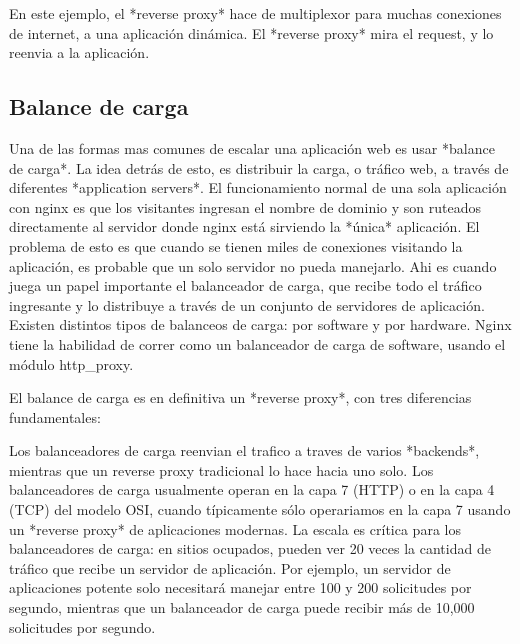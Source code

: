 En este ejemplo, el *reverse proxy* hace de multiplexor para muchas conexiones de internet, a una aplicación dinámica. El *reverse proxy* mira el request, y lo reenvia a la aplicación.

\subsection[Balance de carga]{Balance de carga}

Una de las formas mas comunes de escalar una aplicación web es usar *balance de carga*. La idea detrás de esto, es distribuir la carga, o tráfico web, a través de diferentes *application servers*.
El funcionamiento normal de una sola aplicación con nginx es que los visitantes ingresan el nombre de dominio y son ruteados directamente al servidor donde nginx está sirviendo la *única* aplicación. El problema de esto es que cuando se tienen miles de conexiones visitando la aplicación, es probable que un solo servidor no pueda manejarlo. 
Ahi es cuando juega un papel importante el balanceador de carga, que recibe todo el tráfico ingresante y lo distribuye a través de un conjunto de servidores de aplicación.
Existen distintos tipos de balanceos de carga: por software y por hardware. Nginx tiene la habilidad de correr como un balanceador de carga de software, usando el módulo http_proxy.

El balance de carga es en definitiva un *reverse proxy*, con tres diferencias fundamentales: 
\begin{outline}
\1 Los balanceadores de carga reenvian el trafico a traves de varios *backends*, mientras que un reverse proxy tradicional lo hace hacia uno solo.
\1 Los balanceadores de carga usualmente operan en la capa 7 (HTTP) o en la capa 4 (TCP) del modelo OSI, cuando típicamente sólo operariamos en la capa 7 usando un *reverse proxy* de aplicaciones modernas.
\1 La escala es crítica para los balanceadores de carga: en sitios ocupados, pueden ver 20 veces la cantidad de tráfico que recibe un servidor de aplicación. Por ejemplo, un servidor de aplicaciones potente solo necesitará manejar entre 100 y 200 solicitudes por segundo, mientras que un balanceador de carga puede recibir más de 10,000 solicitudes por segundo.
\end{outline}